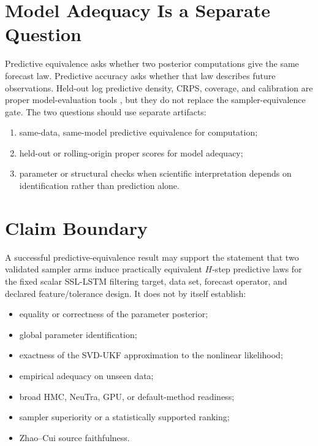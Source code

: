 \section{Model Adequacy Is a Separate Question}
\label{sec:bf-ssl-lstm-model-adequacy}

Predictive equivalence asks whether two posterior computations give the same
forecast law.  Predictive accuracy asks whether that law describes future
observations.  Held-out log predictive density, CRPS, coverage, and calibration
are proper model-evaluation tools \citep{gneiting2007proper}, but they do not
replace the sampler-equivalence gate.  The two questions should use separate
artifacts:
\begin{enumerate}
  \item same-data, same-model predictive equivalence for computation;
  \item held-out or rolling-origin proper scores for model adequacy;
  \item parameter or structural checks when scientific interpretation depends
    on identification rather than prediction alone.
\end{enumerate}

\section{Claim Boundary}
\label{sec:bf-ssl-lstm-predictive-claim-boundary}

A successful predictive-equivalence result may support the statement that two
validated sampler arms induce practically equivalent $H$-step predictive laws
for the fixed scalar SSL-LSTM filtering target, data set, forecast operator,
and declared feature/tolerance design.  It does not by itself establish:
\begin{itemize}
  \item equality or correctness of the parameter posterior;
  \item global parameter identification;
  \item exactness of the SVD-UKF approximation to the nonlinear likelihood;
  \item empirical adequacy on unseen data;
  \item broad HMC, NeuTra, GPU, or default-method readiness;
  \item sampler superiority or a statistically supported ranking;
  \item Zhao--Cui source faithfulness.
\end{itemize}

